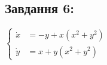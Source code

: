 \subsection*{Завдання 6:}

$\left\{\begin{aligned}
    \dot{x} &= -y + x(x^2 + y^2)\\
    \dot{y} &= x +y(x^2 + y^2) 
\end{aligned}\right.$